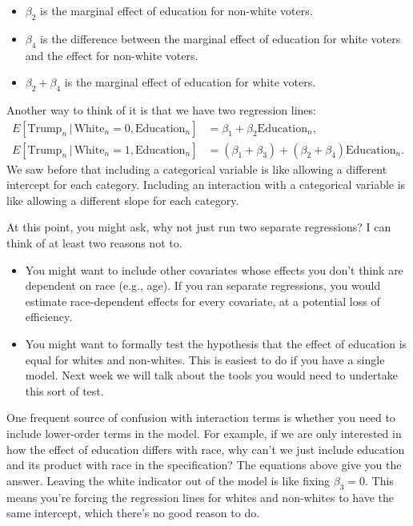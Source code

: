 \documentclass[12pt,oneside,openany]{book}
\begin{document}
\begin{itemize}
\item
  \(\beta_2\) is the marginal effect of education for non-white voters.
\item
  \(\beta_4\) is the difference between the marginal effect of education
  for white voters and the effect for non-white voters.
\item
  \(\beta_2 + \beta_4\) is the marginal effect of education for white
  voters.
\end{itemize}

Another way to think of it is that we have two regression lines: \[
\begin{aligned}
  E[\text{Trump}_n \,|\, \text{White}_n = 0, \text{Education}_n] &= \beta_1 + \beta_2 \text{Education}_n, \\
  E[\text{Trump}_n \,|\, \text{White}_n = 1, \text{Education}_n] &= (\beta_1 + \beta_3) + (\beta_2 + \beta_4) \text{Education}_n.
\end{aligned}
\] We saw before that including a categorical variable is like allowing
a different intercept for each category. Including an interaction with a
categorical variable is like allowing a different slope for each
category.

At this point, you might ask, why not just run two separate regressions?
I can think of at least two reasons not to.

\begin{itemize}
\item
  You might want to include other covariates whose effects you don't
  think are dependent on race (e.g., age). If you ran separate
  regressions, you would estimate race-dependent effects for every
  covariate, at a potential loss of efficiency.
\item
  You might want to formally test the hypothesis that the effect of
  education is equal for whites and non-whites. This is easiest to do if
  you have a single model. Next week we will talk about the tools you
  would need to undertake this sort of test.
\end{itemize}

One frequent source of confusion with interaction terms is whether you
need to include lower-order terms in the model. For example, if we are
only interested in how the effect of education differs with race, why
can't we just include education and its product with race in the
specification? The equations above give you the answer. Leaving the
white indicator out of the model is like fixing \(\beta_3 = 0\). This
means you're forcing the regression lines for whites and non-whites to
have the same intercept, which there's no good reason to do.
\end{document}
